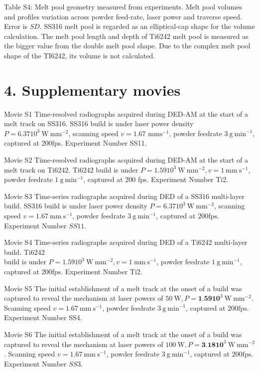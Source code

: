 \documentclass[10pt]{article}
\begin{document}
Table S4: Melt pool geometry measured from experiments. Melt pool volumes and profiles variation across powder feed-rate, laser power and traverse speed. Error is $S D$. SS316 melt pool is regarded as an elliptical-cap shape for the volume calculation. The melt pool length and depth of Ti6242 melt pool is measured as the bigger value from the double melt pool shape. Due to the complex melt pool shape of the TI6242, its volume is not calculated.

\section*{4. Supplementary movies}
Movie S1 Time-resolved radiographs acquired during DED-AM at the start of a melt track on SS316. SS316 build is under laser power density $P=6.3710^{3} \mathrm{~W} \mathrm{~mm}^{-2}$, scanning speed $v=1.67$ $\mathrm{mm} \mathrm{s}^{-1}$, powder feedrate $3 \mathrm{~g} \mathrm{~min}^{-1}$, captured at $200 \mathrm{fps}$. Experiment Number SS11.

Movie S2 Time-resolved radiographs acquired during DED-AM at the start of a melt track on Ti6242. Ti6242 build is under $P=1.5910^{3} \mathrm{~W} \mathrm{~mm}^{-2}, v=1 \mathrm{~mm} \mathrm{~s}^{-1}$, powder feedrate $1 \mathrm{~g} \mathrm{~min}^{-1}$, captured at 200 fps. Experiment Number Ti2.

Movie S3 Time-series radiographs acquired during DED of a SS316 multi-layer build. SS316 build is under laser power density $P=6.3710^{3} \mathrm{~W} \mathrm{~mm}^{-2}$, scanning speed $v=1.67 \mathrm{~mm} \mathrm{~s}^{-1}$, powder feedrate $3 \mathrm{~g} \mathrm{~min}^{-1}$, captured at $200 \mathrm{fps}$. Experiment Number $S S 11$.

Movie S4 Time-series radiographs acquired during DED of a Ti6242 multi-layer build. Ti6242\\
build is under $P=1.5910^{3} \mathrm{~W} \mathrm{~mm}^{-2}, v=1 \mathrm{~mm} \mathrm{~s}^{-1}$, powder feedrate $1 \mathrm{~g} \mathrm{~min}^{-1}$, captured at $200 \mathrm{fps}$. Experiment Number Ti2.

Movie S5 The initial establishment of a melt track at the onset of a build was captured to reveal the mechanism at laser powers of $50 \mathrm{~W}, P=\mathbf{1 . 5 9} \mathbf{1 0}^{3} \mathrm{~W} \mathrm{~mm}^{-2}$. Scanning speed $v=1.67 \mathrm{~mm} \mathrm{~s}^{-1}$, powder feedrate $3 \mathrm{~g} \mathrm{~min}^{-1}$, captured at $200 \mathrm{fps}$. Experiment Number SS4.

Movie S6 The initial establishment of a melt track at the onset of a build was captured to reveal the mechanism at laser powers of $100 \mathrm{~W}, P=\mathbf{3 . 1 8} \mathbf{1 0}^{3} \mathrm{~W} \mathrm{~mm}^{-2}$. Scanning speed $v=1.67 \mathrm{~mm} \mathrm{~s}^{-1}$, powder feedrate $3 \mathrm{~g} \mathrm{~min}^{-1}$, captured at $200 \mathrm{fps}$. Experiment Number $S S 3$.
\end{document}
